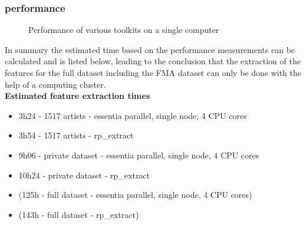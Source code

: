 \subsubsection{performance}

\begin{figure}[htbp]
	\centering
	\caption{Performance of various toolkits on a single computer}
	\label{perfex}
\end{figure}
In summary the estimated time based on the performance measurements can be calculated and is listed below, leading to the conclusion that the extraction of the features for the full dataset including the FMA dataset can only be done with the help of a computing cluster.
\ \\
\textbf{Estimated feature extraction times}
\begin{itemize}
	\setlength\itemsep{-0.5em}
	\item 3h24 - 1517 artists - essentia parallel, single node, 4 CPU cores
	\item 3h54 - 1517 artists - rp\_extract
	\item 9h06 - private dataset - essentia parallel, single node, 4 CPU cores
	\item 10h24 - private dataset - rp\_extract
	\item (125h - full dataset - essentia parallel, single node, 4 CPU cores)
	\item (143h - full dataset - rp\_extract)
\end{itemize}


